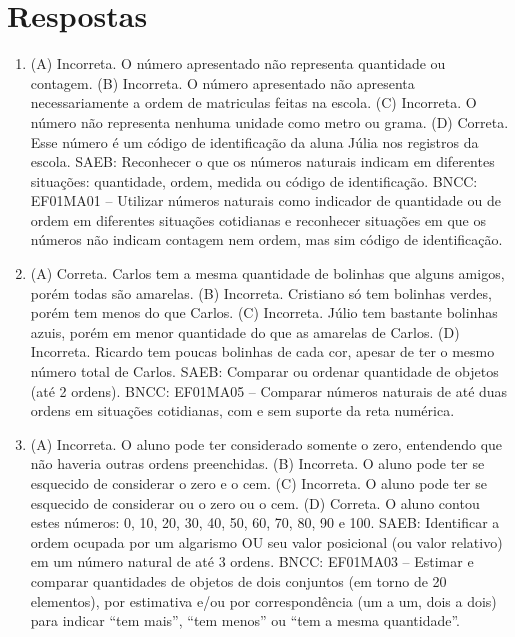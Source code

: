 \chapter{Respostas}
\pagestyle{plain}
\footnotesize

\pagecolor{gray!40}


\begin{enumerate}
\item
(A) Incorreta. O número apresentado não representa quantidade ou contagem.
(B) Incorreta. O número apresentado não apresenta necessariamente a ordem de matriculas feitas na escola.
(C) Incorreta. O número não representa nenhuma unidade como metro ou grama.
(D) Correta. Esse número é um código de identificação da aluna Júlia nos registros da escola.
SAEB: Reconhecer o que os números naturais indicam em diferentes
situações: quantidade, ordem, medida ou código de identificação.
BNCC: EF01MA01 -- Utilizar números naturais como indicador de quantidade
ou de ordem em diferentes situações cotidianas e reconhecer situações em
que os números não indicam contagem nem ordem, mas sim código de
identificação.

\item
(A) Correta. Carlos tem a mesma quantidade de bolinhas que alguns amigos, porém todas são amarelas.
(B) Incorreta. Cristiano só tem bolinhas verdes, porém tem menos do que Carlos.
(C) Incorreta. Júlio tem bastante bolinhas azuis, porém em menor quantidade do que as amarelas de Carlos.
(D) Incorreta. Ricardo tem poucas bolinhas de cada cor, apesar de ter o mesmo número total de Carlos.
SAEB: Comparar ou ordenar quantidade de objetos (até 2 ordens).
BNCC: EF01MA05 -- Comparar números naturais de até duas ordens em
situações cotidianas, com e sem suporte da reta numérica.

\item
(A)  Incorreta. O aluno pode ter considerado somente o zero, entendendo que não haveria outras ordens preenchidas.
(B)  Incorreta. O aluno pode ter se esquecido de considerar o zero e o cem.
(C)  Incorreta. O aluno pode ter se esquecido de considerar ou o zero ou o cem.
(D)  Correta. O aluno contou estes números: 0, 10, 20, 30, 40, 50, 60, 70, 80, 90 e 100.
SAEB: Identificar a ordem ocupada por um algarismo OU seu valor
posicional (ou valor relativo) em um número natural de até 3 ordens.
BNCC: EF01MA03 -- Estimar e comparar quantidades de objetos de dois
conjuntos (em torno de 20 elementos), por estimativa e/ou por
correspondência (um a um, dois a dois) para indicar ``tem mais'', ``tem
menos'' ou ``tem a mesma quantidade''.
\end{enumerate}


